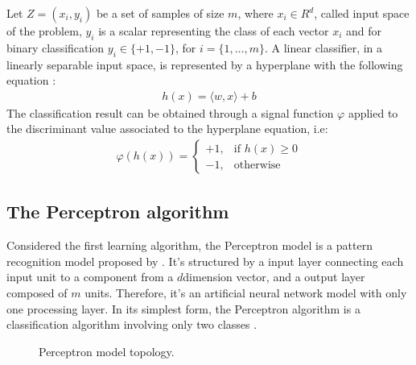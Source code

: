 \documentclass[letterpaper,10pt,english]{sphinxmanual}
\let\sphinxpxdimen\pdfpxdimen\else\newdimen\sphinxpxdimen
\begin{document}
\sphinxAtStartPar
Let \(Z = (x_{i}, y_{i})\) be a set of samples of size \(m\), where \(x_{i} \in R^{d}\), called input space of the problem,
\(y_{i}\) is a scalar representing the class of each vector \(x_{i}\) and for binary classification \(y_{i} \in \{+1,-1\}\),
for \(i = \{1, \dots, m\}\). A linear classifier, in a linearly separable input space, is represented by a hyperplane with the following equation :
\begin{equation*}
\begin{split}h(x) = \langle w, x \rangle + b\end{split}
\end{equation*}
\sphinxAtStartPar
The classification result can be obtained through a signal function \(\varphi\) applied to the discriminant value associated to the hyperplane equation, i.e:
\begin{equation*}
\begin{split}\varphi (h(x)) =
\begin{cases}
  +1,& \text{if } h(x) \geq 0\\
  -1,& \text{otherwise}
\end{cases}\end{split}
\end{equation*}

\subsection{The Perceptron algorithm}
\label{\detokenize{getting_started/classification:the-perceptron-algorithm}}
\sphinxAtStartPar
Considered the first learning algorithm, the Perceptron model is a pattern recognition model proposed by . It’s structured by
a input layer connecting each input unit to a component from a \(d\)\sphinxhyphen{}dimension vector, and a output layer composed of \(m\) units.
Therefore, it’s an artificial neural network model with only one processing layer. In its simplest form, the Perceptron algorithm is a classification
algorithm involving only two classes .

\begin{figure}[htbp]
\centering
\capstart

\noindent\sphinxincludegraphics[width=300\sphinxpxdimen]{{perceptron-topology}.png}
\caption{Perceptron model topology.}\label{\detokenize{getting_started/classification:id15}}\end{figure}
\end{document}
